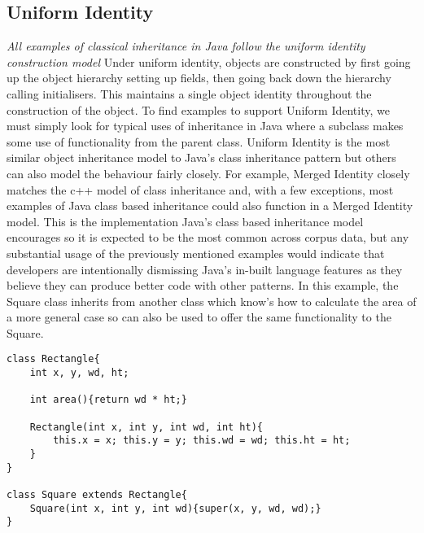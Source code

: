 \subsection{Uniform Identity}
\textit{All examples of classical inheritance in Java follow the uniform identity construction model}\newline\newline
Under uniform identity, objects are constructed by first going up the object hierarchy setting up fields, then going back down the hierarchy calling initialisers. This maintains a single object identity throughout the construction of the object.\newline
To find examples to support Uniform Identity, we must simply look for typical uses of inheritance in Java where a subclass makes some use of functionality from the parent class. Uniform Identity is the most similar object inheritance model to Java’s class inheritance pattern but others can also model the behaviour fairly closely. For example, Merged Identity closely matches the c++ model of class inheritance and, with a few exceptions, most examples of Java class based inheritance could also function in a Merged Identity model. This is the implementation Java’s class based inheritance model encourages so it is expected to be the most common across corpus data, but any substantial usage of the previously mentioned examples would indicate that developers are intentionally dismissing Java’s in-built language features as they believe they can produce better code with other patterns.\newline
In this example, the Square class inherits from another class which know’s how to calculate the area of a more general case so can also be used to offer the same functionality to the Square. 
\begin{lstlisting}
class Rectangle{
	int x, y, wd, ht;
	
	int area(){return wd * ht;}
	
	Rectangle(int x, int y, int wd, int ht){
		this.x = x; this.y = y; this.wd = wd; this.ht = ht;
	}
}

class Square extends Rectangle{
	Square(int x, int y, int wd){super(x, y, wd, wd);}
}
\end{lstlisting}
